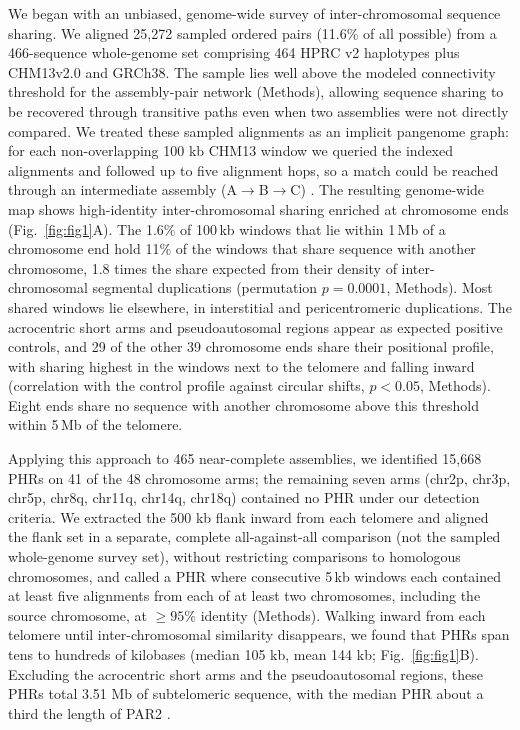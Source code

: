 \documentclass[pdflatex,mathphys]{jnl}
\begin{document}
We began with an unbiased, genome-wide survey of inter-chromosomal sequence sharing. We aligned 25,272 sampled
ordered pairs (11.6\% of all possible) from a 466-sequence whole-genome set
comprising 464 HPRC v2 haplotypes plus CHM13v2.0 and GRCh38.
The sample lies well above the modeled connectivity threshold for the
assembly-pair network (Methods), allowing sequence sharing to be recovered
through transitive paths even when two assemblies were not directly compared. We treated these
sampled alignments as an implicit pangenome graph: for each non-overlapping
100 kb CHM13 window we queried the indexed alignments and followed up to five
alignment hops, so a match could be reached through an intermediate assembly
(A$\rightarrow$B$\rightarrow$C) \cite{pangenome_graphs_impg_IMPG2023}.
The resulting genome-wide map shows high-identity inter-chromosomal sharing enriched at
chromosome ends (Fig.~\ref{fig:fig1}A). The 1.6\% of 100\,kb windows that lie within 1\,Mb of a
chromosome end hold 11\% of the windows that share sequence with another chromosome, 1.8 times the
share expected from their density of inter-chromosomal segmental duplications (permutation
$p = 0.0001$, Methods). Most shared windows lie elsewhere, in interstitial and pericentromeric
duplications. The acrocentric short
arms and pseudoautosomal regions appear as expected positive controls, and 29 of the
other 39 chromosome ends share their positional profile, with sharing highest in the windows
next to the telomere and falling inward (correlation with the control profile against circular
shifts, $p < 0.05$, Methods). Eight ends share no sequence with another chromosome above this
threshold within 5\,Mb of the telomere.

Applying this approach to 465 near-complete assemblies, we identified 15,668
PHRs on 41 of the 48 chromosome arms; the remaining seven arms (chr2p, chr3p,
chr5p, chr8q, chr11q, chr14q, chr18q) contained no PHR under our detection
criteria. We extracted the 500 kb flank inward from each telomere and aligned the
flank set in a separate, complete all-against-all comparison (not the sampled
whole-genome survey set), without restricting comparisons to homologous
chromosomes, and called a PHR where consecutive 5\,kb windows each contained at least
five alignments from each of at least two chromosomes, including the source
chromosome, at $\geq 95\%$ identity (Methods).
Walking inward from each telomere until inter-chromosomal similarity disappears,
we found that PHRs span tens to hundreds of kilobases (median 105 kb, mean 144 kb;
Fig.~\ref{fig:fig1}B).
Excluding the acrocentric short arms and the pseudoautosomal regions, these PHRs
total 3.51 Mb of subtelomeric sequence, with the median PHR about a third the
length of PAR2 \cite{sexchrompars_bellott2024}.
\end{document}
